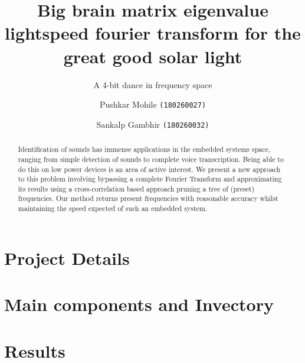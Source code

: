\documentclass{llncs}
\title{Big brain matrix eigenvalue lightspeed fourier transform for the great good solar light}
\subtitle{A 4-bit dance in frequency space}
\author{Pushkar Mohile \texttt{(180260027)}\inst{1} \and Sankalp Gambhir \texttt{(180260032)}\inst{1}}
\institute{Indian Institute of Technology, Bombay}
\begin{document}
    \maketitle

    \begin{abstract}
    Identification of sounds has immense applications in the embedded systems space,
    ranging from simple detection of sounds to complete voice transcription. Being
    able to do this on low power devices is an area of active interest. We present a
    new approach to this problem involving bypassing a complete Fourier Transform
    and approximating its results using a cross-correlation based approach pruning a
    tree of (preset) frequencies. Our method returns present frequencies with
    reasonable accuracy whilst maintaining the speed expected of such an embedded
    system.
    \end{abstract}

    \section{Project Details}
        

    \section{Main components and Invectory}
        

    \section{Results}
        

    \newpage
        
\end{document}
